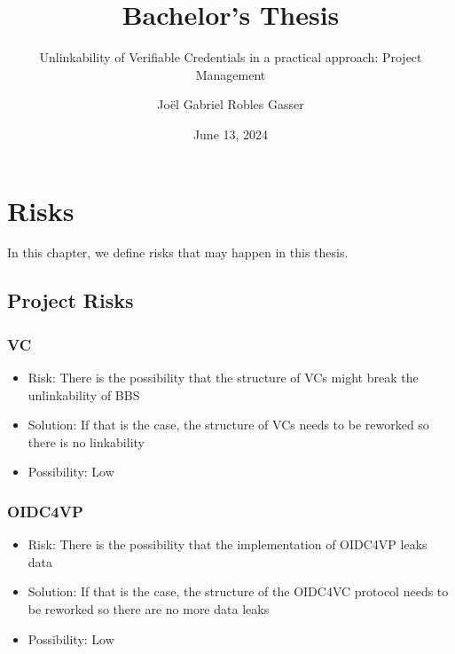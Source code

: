 \documentclass[
	a4paper               %
	,BCOR=0mm            %
	,bibliography=totoc   %
	,listof=totoc         %
	,monolingual
	,twoside=false
]{bfhthesis}              %
\begin{document}
\frontmatter

\title{Bachelor's Thesis}
\subtitle{Unlinkability of Verifiable Credentials in a practical approach: Project Management}
\author{Joël Gabriel Robles Gasser}
\date{June 13, 2024}

\maketitle


\tableofcontents

\mainmatter

\chapter{Risks}
In this chapter, we define risks that may happen in this thesis.

\section{Project Risks}

\subsection{VC}
\begin{itemize}
	\item Risk: There is the possibility that the structure of VCs might break the unlinkability of BBS
	\item Solution: If that is the case, the structure of VCs needs to be reworked so there is no linkability
	\item Possibility: Low
\end{itemize}

\subsection{OIDC4VP}
\begin{itemize}
	\item Risk: There is the possibility that the implementation of OIDC4VP leaks data
	\item Solution: If that is the case, the structure of the OIDC4VC protocol needs to be reworked so there are no more data leaks
	\item Possibility: Low
\end{itemize}
\end{document}
